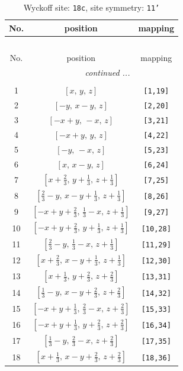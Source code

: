 \documentclass[fleqn,8pt]{jsarticle}
\begin{document}
\begin{longtable}{ccc}
\caption{Wyckoff site: {\tt 18c}, site symmetry: {\tt 11'}}
 \\
 \hline \hline
No. & position & mapping \\ \hline \endfirsthead

\multicolumn{2}{l}{\tablename\ \thetable{}} \\
 \hline \hline
No. & position & mapping \\ \hline \endhead

 \hline \hline
\multicolumn{2}{r}{\footnotesize\it continued ...} \\ \endfoot

 \hline \hline
\multicolumn{2}{r}{} \\ \endlastfoot

1 & $\left[ x,\, y,\, z \right]$ & {\tt [1,19]} \\ \hline
2 & $\left[ - y,\, x - y,\, z \right]$ & {\tt [2,20]} \\ \hline
3 & $\left[ - x + y,\, - x,\, z \right]$ & {\tt [3,21]} \\ \hline
4 & $\left[ - x + y,\, y,\, z \right]$ & {\tt [4,22]} \\ \hline
5 & $\left[ - y,\, - x,\, z \right]$ & {\tt [5,23]} \\ \hline
6 & $\left[ x,\, x - y,\, z \right]$ & {\tt [6,24]} \\ \hline
7 & $\left[ x + \frac{2}{3},\, y + \frac{1}{3},\, z + \frac{1}{3} \right]$ & {\tt [7,25]} \\ \hline
8 & $\left[ \frac{2}{3} - y,\, x - y + \frac{1}{3},\, z + \frac{1}{3} \right]$ & {\tt [8,26]} \\ \hline
9 & $\left[ - x + y + \frac{2}{3},\, \frac{1}{3} - x,\, z + \frac{1}{3} \right]$ & {\tt [9,27]} \\ \hline
10 & $\left[ - x + y + \frac{2}{3},\, y + \frac{1}{3},\, z + \frac{1}{3} \right]$ & {\tt [10,28]} \\ \hline
11 & $\left[ \frac{2}{3} - y,\, \frac{1}{3} - x,\, z + \frac{1}{3} \right]$ & {\tt [11,29]} \\ \hline
12 & $\left[ x + \frac{2}{3},\, x - y + \frac{1}{3},\, z + \frac{1}{3} \right]$ & {\tt [12,30]} \\ \hline
13 & $\left[ x + \frac{1}{3},\, y + \frac{2}{3},\, z + \frac{2}{3} \right]$ & {\tt [13,31]} \\ \hline
14 & $\left[ \frac{1}{3} - y,\, x - y + \frac{2}{3},\, z + \frac{2}{3} \right]$ & {\tt [14,32]} \\ \hline
15 & $\left[ - x + y + \frac{1}{3},\, \frac{2}{3} - x,\, z + \frac{2}{3} \right]$ & {\tt [15,33]} \\ \hline
16 & $\left[ - x + y + \frac{1}{3},\, y + \frac{2}{3},\, z + \frac{2}{3} \right]$ & {\tt [16,34]} \\ \hline
17 & $\left[ \frac{1}{3} - y,\, \frac{2}{3} - x,\, z + \frac{2}{3} \right]$ & {\tt [17,35]} \\ \hline
18 & $\left[ x + \frac{1}{3},\, x - y + \frac{2}{3},\, z + \frac{2}{3} \right]$ & {\tt [18,36]} \\
\end{longtable}
\end{document}
